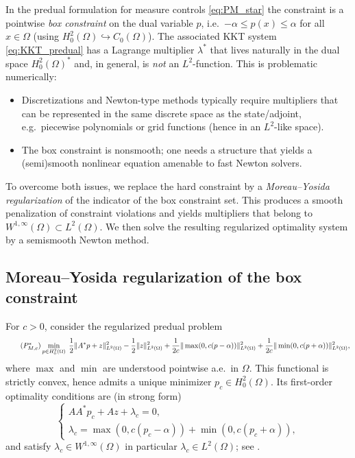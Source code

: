 \documentclass[11pt,a4paper]{article}
\begin{document}
In the predual formulation for measure controls \eqref{eq:PM_star}
the constraint is a pointwise \emph{box constraint} on the dual variable $p$, i.e.\ $-\alpha\le p(x)\le \alpha$ for all $x\in\Omega$
(using $H^2_0(\Omega)\hookrightarrow C_0(\Omega)$).
The associated KKT system \eqref{eq:KKT_predual} has a Lagrange multiplier $\lambda^\ast$ that lives naturally in the dual space $H^2_0(\Omega)^\ast$ and, in general, is \emph{not} an $L^2$-function.
This is problematic numerically:
\begin{itemize}
\item Discretizations and Newton-type methods typically require multipliers that can be represented in the same discrete space as the state/adjoint,
      e.g.\ piecewise polynomials or grid functions (hence in an $L^2$-like space).
\item The box constraint is nonsmooth; one needs a structure that yields a (semi)smooth nonlinear equation amenable to fast Newton solvers.
\end{itemize}

To overcome both issues, we replace the hard constraint by a \emph{Moreau--Yosida regularization} of the indicator of the box constraint set.
This produces a smooth penalization of constraint violations and yields multipliers that belong to $W^{1,\infty}(\Omega)\subset L^2(\Omega)$.
We then solve the resulting regularized optimality system by a semismooth Newton method.

\subsection{Moreau--Yosida regularization of the box constraint}

For $c>0$, consider the regularized predual problem
\[
\tag{$P_{M,c}^\ast$}
\label{eq:PM_star_r}
\min_{p\in H^2_0(\Omega)}\;
\frac12\|A^\ast p + z\|_{L^2(\Omega)}^2-\frac12\|z\|_{L^2(\Omega)}^2
+\frac{1}{2c}\|\max(0,c(p-\alpha))\|_{L^2(\Omega)}^2
+\frac{1}{2c}\|\min(0,c(p+\alpha))\|_{L^2(\Omega)}^2,
\]
where $\max$ and $\min$ are understood pointwise a.e.\ in $\Omega$.
This functional is strictly convex, hence admits a unique minimizer $p_c\in H^2_0(\Omega)$.
Its first-order optimality conditions are (in strong form)
\begin{equation}\label{eq:MY_opt_system}
\begin{cases}
AA^\ast p_c + Az + \lambda_c = 0,\\
\lambda_c = \max(0,c(p_c-\alpha))+\min(0,c(p_c+\alpha)),
\end{cases}
\end{equation}
and satisfy $\lambda_c\in W^{1,\infty}(\Omega)$ in particular $\lambda_c\in L^2(\Omega)$; see \cite{ClasonKunisch2009}.
\end{document}
